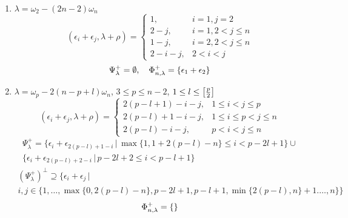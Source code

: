 \begin{enumerate}
 \item $\lambda =  \omega_2 - (2n-2)\omega_n $\\
  \[
   (\epsilon_i + \epsilon_j,\lambda+\rho) = \begin{cases}
                                             1, &  i=1,j=2 \\
                                             2-j, & i=1, 2 < j \leq n\\
                                             1-j, & i=2, 2 < j \leq n \\
                                             2-i-j, & 2 < i < j
                                            \end{cases}
  \]
  \[
   \Psi^+_\lambda = \emptyset, \quad \Phi^+_{n,\lambda} = \{ \epsilon_1 + \epsilon_2 \}
  \]

 \item $\lambda = \omega_p -2(n-p+l) \omega_n$, $3\leq p \leq n-2$, $1\leq l \leq \left[ \frac{p}{2} \right]$\\
  \[
   (\epsilon_i + \epsilon_j,\lambda+\rho) = \begin{cases}
                                             2(p-l+1)-i-j, & 1\leq i < j \leq p \\
                                             2(p-l)+1-i-j, & 1 \leq i \leq p < j \leq n\\
                                             2(p-l)-i-j, &  p <i < j \leq n
                                            \end{cases}
  \]
  \begin{multline*}
   \Psi^+_\lambda = \{ \epsilon_i + \epsilon_{2(p-l)+1-i} \,|\, \max\{1,1+2(p-l)-n\} \leq i < p-2l+1 \} \cup \\  \{ \epsilon_i + \epsilon_{2(p-l)+2-i} \,|\, p-2l+2 \leq i < p-l+1 \}
  \end{multline*}
  \begin{multline*}
   (\Psi^+_\lambda)^\perp \supseteq \{ \epsilon_i + \epsilon_j \,|\, \\ i,j \in \{ 1,\ldots,\max\{0,2(p-l)-n\},p-2l+1,p-l+1,\min\{ 2(p-l),n \}+1.\ldots,n \} \}
  \end{multline*}
  \[
   \Phi^+_{n,\lambda} = \{ \}
  \]


\end{enumerate}
